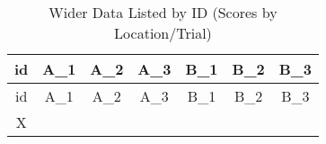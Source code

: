 \documentclass[]{book}
\begin{document}
\begin{longtable}[]{@{}ccccccc@{}}
\caption{\label{tab:wider} Wider Data Listed by ID (Scores by Location/Trial)}\tabularnewline
\toprule
\begin{minipage}[b]{0.06\columnwidth}\centering
id\strut
\end{minipage} & \begin{minipage}[b]{0.08\columnwidth}\centering
A\_1\strut
\end{minipage} & \begin{minipage}[b]{0.07\columnwidth}\centering
A\_2\strut
\end{minipage} & \begin{minipage}[b]{0.08\columnwidth}\centering
A\_3\strut
\end{minipage} & \begin{minipage}[b]{0.08\columnwidth}\centering
B\_1\strut
\end{minipage} & \begin{minipage}[b]{0.08\columnwidth}\centering
B\_2\strut
\end{minipage} & \begin{minipage}[b]{0.08\columnwidth}\centering
B\_3\strut
\end{minipage}\tabularnewline
\midrule
\endfirsthead
\toprule
\begin{minipage}[b]{0.06\columnwidth}\centering
id\strut
\end{minipage} & \begin{minipage}[b]{0.08\columnwidth}\centering
A\_1\strut
\end{minipage} & \begin{minipage}[b]{0.07\columnwidth}\centering
A\_2\strut
\end{minipage} & \begin{minipage}[b]{0.08\columnwidth}\centering
A\_3\strut
\end{minipage} & \begin{minipage}[b]{0.08\columnwidth}\centering
B\_1\strut
\end{minipage} & \begin{minipage}[b]{0.08\columnwidth}\centering
B\_2\strut
\end{minipage} & \begin{minipage}[b]{0.08\columnwidth}\centering
B\_3\strut
\end{minipage}\tabularnewline
\midrule
\endhead
\begin{minipage}[t]{0.06\columnwidth}\centering
X\strut
\end{minipage} & \begin{minipage}[t]{0.08\columnwidth}\centering

\end{minipage}
\end{longtable}
\end{document}
